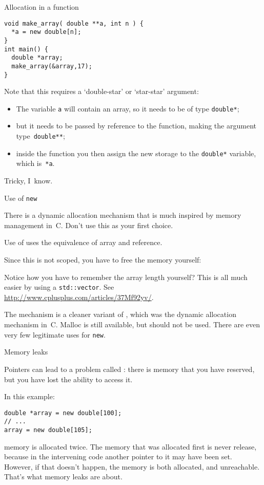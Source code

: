 \begin{block}{Allocation in a function}
\begin{lstlisting}
void make_array( double **a, int n ) {
  *a = new double[n];
}
int main() {
  double *array;
  make_array(&array,17);
}
\end{lstlisting}
\end{block}

Note that this requires a `double-star' or `star-star' argument:
\begin{itemize}
\item The variable \lstinline{a} will contain an array, so it needs to be of
  type \lstinline{double*};
\item but it needs to be passed by reference to the function, making
  the argument type~\lstinline{double**};
\item inside the function you then assign the new storage to the
  \lstinline{double*} variable, which is~\lstinline{*a}.
\end{itemize}
Tricky, I~know.

 {Use of \texttt{new}}
\label{sec:cnew}

\prerequisite{\ref{sec:arraypointer}}

There is a dynamic allocation mechanism that is much inspired by
memory management in~C. Don't use this as your first choice.

Use of  uses the 
equivalence of array and reference.
%

Since this is not scoped, you have to free the memory yourself:
%

Notice how you have to remember the array length yourself? This is all
much easier by using a \lstinline{std::vector}. See
\url{http://www.cplusplus.com/articles/37Mf92yv/}.

The  mechanism is a cleaner variant of ,
which was the dynamic allocation mechanism in~C. Malloc is still
available, but should not be used. There are even very few legitimate
uses for \lstinline{new}.


 {Memory leaks}
\label{sec:memleak}

Pointers can lead to a problem called :
there is memory that you have reserved, but you have lost the ability
to access it.

In this example:
\begin{lstlisting}
double *array = new double[100];
// ...
array = new double[105];
\end{lstlisting}
memory is allocated twice. The memory that was allocated first is
never release, because in the intervening code another pointer to it
may have been set. However, if that doesn't happen, the memory is both
allocated, and unreachable. That's what memory leaks are about.


